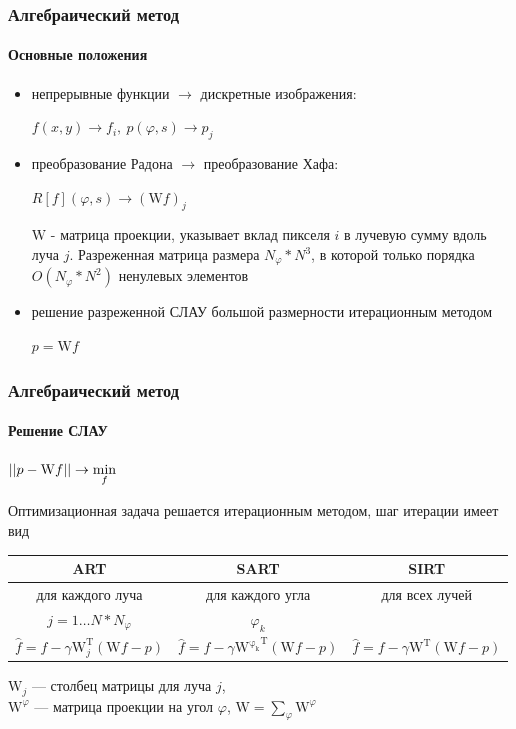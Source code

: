 \documentclass[12pt]{beamer}
\begin{document}
\begin{frame}
\frametitle{Алгебраический метод}
\framesubtitle{Основные положения}
\begin{itemize}
  \item непрерывные функции $\rightarrow$ дискретные изображения:

    {
    \centering
    $f(x,y) \rightarrow f_i,\ p(\varphi, s) \rightarrow p_j$
    \par
    }
  \vspace{0.5cm}
  \item преобразование Радона $\rightarrow$ преобразование Хафа:
  
    {
    \centering
    $R[f](\varphi, s) \rightarrow (\mathrm W f)_j$ 
    \par
    }
  \vspace{0.5cm}

    $\mathrm W$ - матрица проекции, указывает вклад пикселя $i$ в лучевую сумму вдоль луча $j$.
    Разреженная матрица размера $N_\varphi * N^3$, в которой только порядка $O(N_\varphi * N^2)$ ненулевых элементов
    \vspace{0.5cm}
  \item решение разреженной СЛАУ большой размерности итерационным методом

    {
    \centering
    $p = \mathrm W f$
    \par
    }

\end{itemize}
\end{frame}

\begin{frame}
\frametitle{Алгебраический метод}
\framesubtitle{Решение СЛАУ}
\centering
$\left|\left| p - \mathrm W f \right|\right| \rightarrow \min\limits_f$

Оптимизационная задача решается итерационным методом, шаг итерации имеет вид
\vspace{0.5cm}

\begingroup
\footnotesize

\hspace*{-0.5cm}
\begin{tabular}{c|c|c}
ART & SART & SIRT \\ \hline
для каждого луча & для каждого угла & для всех лучей\\
$j = 1 \dots N * N_\varphi$ & $\varphi_k$ & \\
$\hat{f} = f - \gamma \mathrm W^{\mathrm T}_j(\mathrm W f - p)$ &
$\hat{f} = f - \gamma \mathrm {W^{\varphi_k}}^{\mathrm T}(\mathrm W f - p)$ &
$\hat{f} = f - \gamma \mathrm W^{\mathrm T}(\mathrm W f - p)$ \\
\end{tabular}

\vspace{0.5cm}
\raggedright
\endgroup

$\mathrm W_j$ --- столбец матрицы для луча $j$,\\
$\mathrm W^\varphi$ ---  матрица проекции на угол $\varphi$, $\mathrm W = \sum_\varphi {\mathrm W^\varphi}$


\end{frame}
\end{document}

